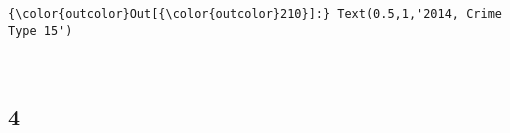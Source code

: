 \documentclass[11pt]{article}
\begin{document}
\begin{Verbatim}[commandchars=\\\{\}]
{\color{outcolor}Out[{\color{outcolor}210}]:} Text(0.5,1,'2014, Crime Type 15')
\end{Verbatim}
            
    \begin{center}
    \end{center}
    { \hspace*{\fill} \\}
    
    \subsection{4}\label{section}
\end{document}
